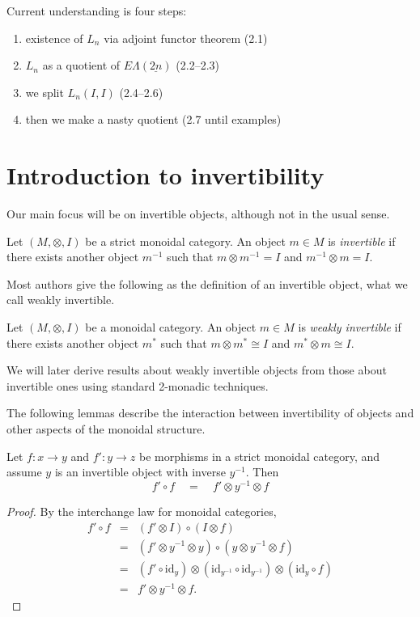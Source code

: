 \documentclass{amsbook} %
\newcommand{\id}{\textrm{id}}
\newcommand{\ELnn}{E\Lambda(\underline{2n})}
\numberwithin{section}{chapter}
\begin{document}
Current understanding is four steps:
\begin{enumerate}
\item existence of $L_n$ via adjoint functor theorem (2.1)
\item $L_n$ as a quotient of $\ELnn$ (2.2--2.3)
\item we split $L_n(I,I)$ (2.4--2.6)
\item then we make a nasty quotient (2.7 until examples)
\end{enumerate}

\section{Introduction to invertibility}

Our main focus will be on invertible objects, although not in the usual sense.
\begin{Defi}
Let $(M, \otimes, I)$ be a strict monoidal category. An object $m \in M$ is \emph{invertible} if there exists another object $m^{-1}$ such that $m \otimes m^{-1} = I$ and $m^{-1} \otimes m = I$.

\end{Defi}

Most authors give the following as the definition of an invertible object, what we call weakly invertible.
\begin{Defi}
Let $(M, \otimes, I)$ be a monoidal category. An object $m \in M$ is \emph{weakly invertible} if there exists another object $m^{*}$ such that $m \otimes m^{*} \cong I$ and $m^{*} \otimes m \cong I$.

\end{Defi}
We will later derive results about weakly invertible objects from those about invertible ones using standard 2-monadic techniques.

The following lemmas describe the interaction between invertibility of objects and other aspects of the monoidal structure.

\begin{lem} \label{tenscomp} Let $f \colon  x \to y$ and $f' \colon  y \to z$ be morphisms in a strict monoidal category, and assume $y$ is an invertible object with inverse $y^{-1}$. Then
\[ f' \circ f \quad = \quad f' \otimes y^{-1} \otimes f \]
\end{lem}
\begin{proof}
By the interchange law for monoidal categories,
\[\begin{array}{rll} 
			f' \circ f & = & (f' \otimes I) \circ (I \otimes f) \\
			& = & (f' \otimes y^{-1} \otimes y) \circ (y \otimes y^{-1} \otimes f) \\
			& = & (f' \circ \id_{y}) \otimes (\id_{y^{-1}} \circ \id_{y^{-1}}) \otimes (\id_y \circ f) \\
			& = & f' \otimes y^{-1} \otimes f .
		\end{array}
\]
\end{proof} 
\end{document}
